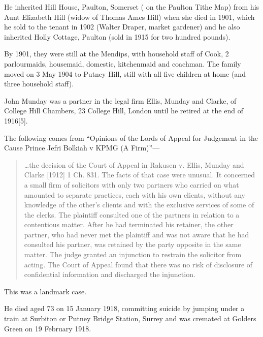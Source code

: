 He inherited Hill House, Paulton, Somerset ( on the Paulton Tithe Map) from his Aunt Elizabeth Hill (widow of Thomas Ames Hill) when she died in 1901, which he sold to the tenant in 1902 (Walter Draper, market gardener) and he also inherited Holly Cottage, Paulton (sold in 1915 for two hundred pounds).

By 1901, they were still at the Mendips, with household staff of Cook, 2 parlourmaids, housemaid, domestic, kitchenmaid and coachman. The family moved on 3 May 1904 to Putney Hill, still with all five children at home (and three household staff).\cite{JohnHillMunday1911}

John Munday was a partner in the legal firm Ellis, Munday and Clarke, of College Hill Chambers, 23 College Hill, London\cite{HeaddingtonMannor} until he retired at the end of 1916[5].

The following comes from ``Opinions of the Lords of Appeal for Judgement in the Cause Prince Jefri Bolkiah v KPMG (A Firm)''\cite{JohnHillMundayJudgement}---

\begin{quotation}
\dots the decision of the Court of Appeal in Rakusen v. Ellis, Munday and Clarke [1912] 1 Ch. 831. The facts of that case were unusual. It concerned a small firm of solicitors with only two partners who carried on what amounted to separate practices, each with his own clients, without any knowledge of the other's clients and with the exclusive services of some of the clerks. The plaintiff consulted one of the partners in relation to a contentious matter. After he had terminated his retainer, the other partner, who had never met the plaintiff and was not aware that he had consulted his partner, was retained by the party opposite in the same matter. The judge granted an injunction to restrain the solicitor from acting. The Court of Appeal found that there was no risk of disclosure of confidential information and discharged the injunction. 
\end{quotation}

This was a landmark case.\cite{JohnHillMundayJudgement}

He died aged 73 on 15 January 1918,\cite{JHMdeath} committing suicide by jumping under a train at Surbiton or Putney Bridge Station, Surrey \cite{JohnHillMundaySuicide} and was cremated at Golders Green on 19 February 1918.

